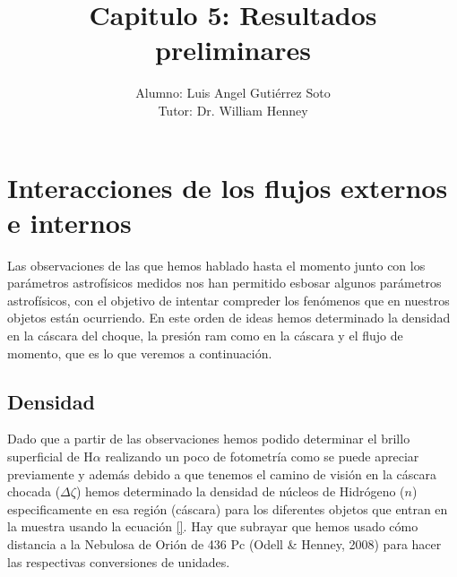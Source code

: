 \documentclass{article}
\title{Capitulo 5: Resultados preliminares }
\author{
  Alumno: Luis Angel Gutiérrez Soto\\
  Tutor: Dr. William Henney
}
\newcommand\ha{\ensuremath{\mathrm{H}\alpha}}
\begin{document}
\maketitle

\section{ Interacciones de los flujos externos e internos}
\label{sec:results}


Las observaciones de las que hemos hablado hasta el momento junto con los parámetros astrofísicos medidos nos han permitido esbosar algunos parámetros astrofísicos, con el objetivo de intentar compreder los fenómenos que en nuestros objetos están ocurriendo. En este orden de ideas hemos determinado la densidad en la cáscara del choque, la presión ram como en la cáscara y el flujo de momento, que es lo que veremos a continuación.

\subsection{Densidad}
\label{sec:density}

Dado que a partir de las observaciones hemos podido determinar el brillo superficial de \(\ha\) realizando un poco de fotometría como se puede apreciar previamente y además debido a que tenemos el camino de visión en la cáscara chocada (\(\Delta \zeta\))  hemos determinado la densidad de núcleos de Hidrógeno (\(n\)) especificamente en esa región (cáscara) para los diferentes objetos que entran en la muestra  usando la ecuación \ref{}. Hay que subrayar que hemos usado cómo distancia a la Nebulosa de Orión de  436 Pc (Odell \& Henney, 2008) para hacer las respectivas conversiones de unidades.\\ 
\end{document}
